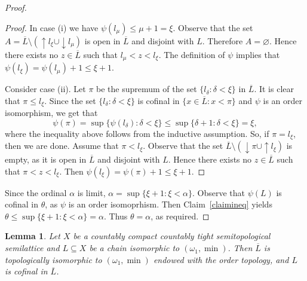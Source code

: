 \documentclass[12pt, twoside, leqno]{article}
\newtheorem{lemma}[theorem]{Lemma}
\theoremstyle{definition}
\numberwithin{equation}{section}
\newcommand{\w}{\omega}
\newcommand{\var}{\varnothing}
\begin{document}
\begin{proof}
\begin{proof}
In case (i) we have $\psi(l_\mu)\leq \mu+1=\xi$. Observe that the set $A=\overline{L}\setminus({\uparrow}l_\xi\cup{\downarrow}l_{\mu})$ is open in $\overline{L}$ and disjoint with $L$. Therefore $A=\var$. Hence there exists no $z\in\overline{L}$ such that $l_\mu<z<l_\xi$. The definition of $\psi$ implies that $\psi(l_\xi)=\psi(l_\mu)+1\leq \xi+1$.

Consider case (ii). Let $\pi$ be the supremum of the set $\{l_{\delta}:\delta<\xi\}$ in $\overline{L}$. It is clear that $\pi\leq l_\xi$. Since the set $\{l_\delta:\delta<\xi\}$ is cofinal in $\{x\in\overline{L}:x<\pi\}$ and $\psi$ is an order isomorphism, we get that $$\psi(\pi)=\sup\{\psi(l_\delta):\delta<\xi\}\leq \sup\{\delta+1:\delta<\xi\}=\xi,$$
where the inequality above follows from the inductive assumption. So, if $\pi=l_\xi$, then we are done. Assume that $\pi<l_\xi$. Observe that the set $\overline{L}\setminus({\downarrow}\pi\cup {\uparrow}l_\xi)$ is empty, as it is open in $\overline{L}$ and disjoint with $L$. Hence there exists no $z\in\overline{L}$ such that $\pi<z<l_\xi$. Then 
$\psi(l_\xi)=\psi(\pi)+1\leq \xi+1$. 
\end{proof}

Since the ordinal $\alpha$ is limit, $\alpha=\sup\{\xi+1: \xi<\alpha\}$. Observe that $\psi(L)$ is cofinal in $\theta$, as $\psi$ is an order isomoprhism. Then   
Claim~\ref{claimineq} yields $\theta\leq \sup\{\xi+1: \xi<\alpha\}=\alpha$. Thus $\theta=\alpha$, as required. 
\end{proof}




 

\begin{lemma}\label{noproofi}
Let $X$ be a countably compact countably tight semitopological semilattice and $L\subseteq X$ be a chain isomorphic to $(\w_1,\min)$. Then $\overline{L}$ is topologically isomorphic to $(\w_1,\min)$ endowed with the order topology, and $L$ is cofinal in $\overline{L}$.       
\end{lemma}
\end{document}
